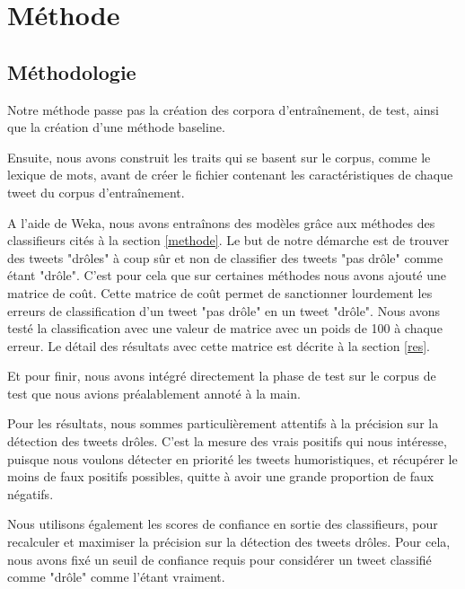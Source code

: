 \documentclass[10pt,a4paper,twoside]{article}
\begin{document}
\section{Méthode}
\label{methClass}

\subsection{Méthodologie}
Notre méthode passe pas la création des corpora d'entraînement, de test, ainsi que la création d'une méthode baseline.

Ensuite, nous avons construit les traits qui se basent sur le corpus, comme le lexique de mots, avant de créer le fichier contenant les caractéristiques de chaque tweet du corpus d'entraînement.

A l'aide de Weka, nous avons entraînons des modèles grâce aux méthodes des classifieurs cités à la section \ref{methode}. Le but de notre démarche est de trouver des tweets "drôles" à coup sûr et non de classifier des tweets "pas drôle" comme étant "drôle". C'est pour cela que sur certaines méthodes nous avons ajouté une matrice de coût. Cette matrice de coût permet de sanctionner lourdement les erreurs de classification d'un tweet "pas drôle" en un tweet "drôle". Nous avons testé la classification avec une valeur de matrice avec un poids de 100 à chaque erreur. Le détail des résultats avec cette matrice est décrite à la section \ref{res}.

Et pour finir, nous avons intégré directement la phase de test sur le corpus de test que nous avions préalablement annoté à la main.

Pour les résultats, nous sommes particulièrement attentifs à la précision sur la détection des tweets drôles. C'est la mesure des vrais positifs qui nous intéresse, puisque nous voulons détecter en priorité les tweets humoristiques, et récupérer le moins de faux positifs possibles, quitte à avoir une grande proportion de faux négatifs.

Nous utilisons également les scores de confiance en sortie des classifieurs, pour recalculer et maximiser la précision sur la détection des tweets drôles. Pour cela, nous avons fixé un seuil de confiance requis pour considérer un tweet classifié comme "drôle" comme l'étant vraiment. 
\end{document}

